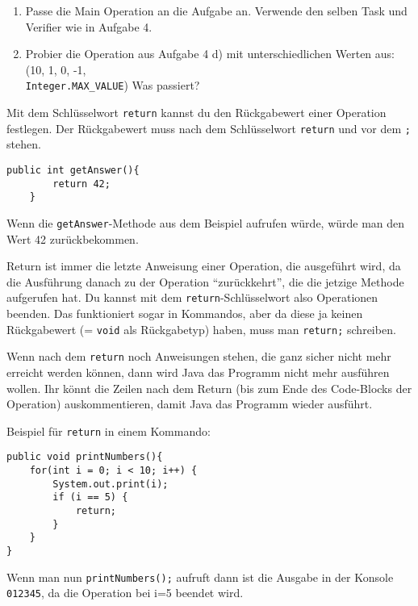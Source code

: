 
\begin{enumerate}
	\item
		Passe die Main Operation an die Aufgabe an.
		Verwende den selben Task und Verifier wie in Aufgabe 4.

	\item
		Probier die Operation aus Aufgabe 4 d) mit unterschiedlichen Werten aus: (10, 1, 0, -1, \\\lstinline{Integer.MAX_VALUE})
		Was passiert?
\end{enumerate}


\begin{Infobox}[Return]
	Mit dem Schlüsselwort \lstinline{return} kannst du den Rückgabewert einer Operation festlegen.
	Der Rückgabewert muss nach dem Schlüsselwort \lstinline{return} und vor dem \lstinline{;} stehen.\newline

	\begin{lstlisting}[xleftmargin=0.5cm]
	public int getAnswer(){
		return 42;
	}
	\end{lstlisting}

	Wenn die \lstinline{getAnswer}-Methode aus dem Beispiel aufrufen würde, würde man den Wert 42 zurückbekommen.\newline

	Return ist immer die letzte Anweisung einer Operation, die ausgeführt wird, da die Ausführung danach zu der Operation \enquote{zurückkehrt}, die die jetzige Methode aufgerufen hat.
	Du kannst mit dem \lstinline{return}-Schlüsselwort also Operationen beenden.
	Das funktioniert sogar in Kommandos, aber da diese ja keinen Rückgabewert (= \lstinline{void} als Rückgabetyp) haben, muss man \lstinline{return;} schreiben.\newline

	Wenn nach dem \lstinline{return} noch Anweisungen stehen, die ganz sicher nicht mehr erreicht werden können, dann wird Java das Programm nicht mehr ausführen wollen.
	Ihr könnt die Zeilen nach dem Return (bis zum Ende des Code-Blocks der Operation) auskommentieren, damit Java das Programm wieder ausführt.\newline

	Beispiel für \lstinline{return} in einem Kommando:

	\begin{lstlisting}[xleftmargin=0.5cm]
public void printNumbers(){
    for(int i = 0; i < 10; i++) {
        System.out.print(i);
        if (i == 5) {
            return;
        }
    }
}
	\end{lstlisting}

	Wenn man nun \lstinline{printNumbers();} aufruft dann ist die Ausgabe in der Konsole \lstinline{012345}, da die Operation bei i=5 beendet wird.
\end{Infobox}


